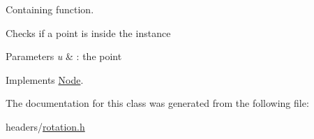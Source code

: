 \-Containing function. 

\-Checks if a point is inside the instance


\begin{DoxyParams}{\-Parameters}
{\em u} & \-: the point \\
\hline
\end{DoxyParams}


\-Implements \hyperlink{class_node_aeecdf01a88be40840b65eb34cecc7a3c}{\-Node}.



\-The documentation for this class was generated from the following file\-:\begin{DoxyCompactItemize}
\item 
headers/\hyperlink{rotation_8h}{rotation.\-h}\end{DoxyCompactItemize}
